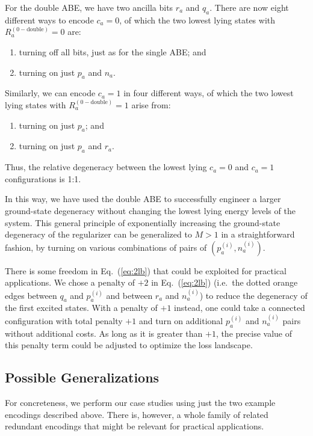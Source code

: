 \documentclass[aps,prd,twocolumn, superscriptaddress,preprintnumbers, nofootinbib,longbibliography,floatfix]{revtex4-2}
\DeclareRobustCommand{\Eq}[1]{Eq.~(\ref{#1})}
\begin{document}
For the double ABE, we have two ancilla bits $r_a$ and $q_a$.
%
There are now eight different ways to encode $c_a = 0$, of which the two lowest lying states with $R_a^{(0-\text{double})}=0$ are:
%
\begin{enumerate}[label=(\roman*)]
\item turning off all bits, just as for the single ABE; and
\item turning on just $p_a$ and $n_a$.
\end{enumerate}
%
Similarly, we can encode $c_a=1$ in four different ways, of which the two lowest lying states with $R_a^{(0-\text{double})}= 1$ arise from:
%
\begin{enumerate}[label=(\roman*)]
\item turning on just $p_a$; and
\item turning on just $p_a$ and $r_a$.
\end{enumerate}
%
Thus, the relative degeneracy between the lowest lying $c_a=0$ and $c_a=1$ configurations is 1:1.


In this way, we have used the double ABE to successfully engineer a larger ground-state degeneracy without changing the lowest lying energy levels of the system. This general principle of exponentially increasing the ground-state degeneracy of the regularizer can be generalized to $M>1$ in a straightforward fashion, by turning on various combinations of pairs of $(p_a^{(i)},n_a^{(i)})$.

There is some freedom in \Eq{eq:2lb} that could be exploited for practical applications.
%
We chose a penalty of $+2$ in \Eq{eq:2lb} (i.e.\ the dotted orange edges between $q_a$ and $p^{(i)}_a$ and between $r_a$ and $n^{(i)}_a$) to reduce the degeneracy of the first excited states.
%
With a penalty of $+1$ instead, one could take a connected configuration with total penalty $+1$ and turn on additional $p^{(i)}_a$ and $n^{(i)}_a$ pairs without additional costs.
%
As long as it is greater than $+1$, the precise value of this penalty term could be adjusted to optimize the loss landscape.


\subsection{Possible Generalizations}

For concreteness, we perform our case studies using just the two example encodings described above.
%
There is, however, a whole family of related redundant encodings that might be relevant for practical applications.
\end{document}
